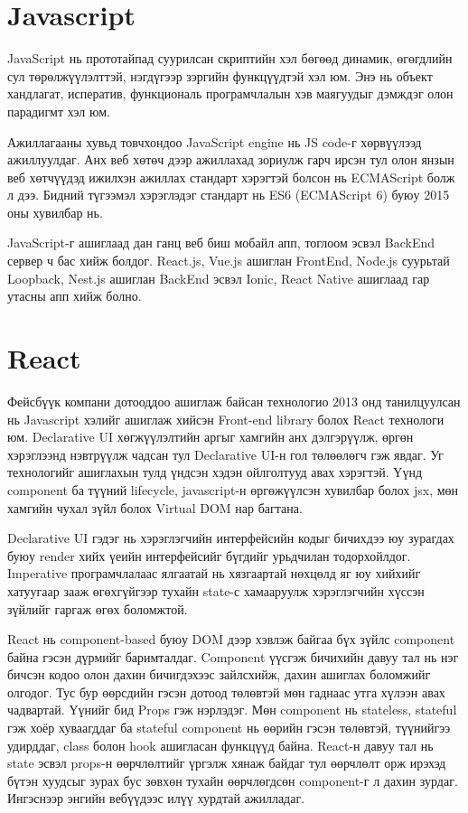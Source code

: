 \section{Javascript}
\quad JavaScript нь прототайпад суурилсан скриптийн хэл бөгөөд динамик, өгөгдлийн сул төрөлжүүлэлттэй, нэгдүгээр зэргийн функцүүдтэй хэл юм. Энэ нь объект хандлагат, исператив, функциональ програмчлалын хэв маягуудыг дэмждэг олон парадигмт хэл юм.

Ажиллагааны хувьд товчхондоо JavaScript engine нь JS code-г хөрвүүлээд ажиллуулдаг. Анх веб хөтөч дээр ажиллахад зориулж гарч ирсэн тул олон янзын веб хөтчүүдэд ижилхэн ажиллах стандарт хэрэгтэй болсон нь ECMAScript болж л дээ. Бидний түгээмэл хэрэглэдэг стандарт нь ES6 (ECMAScript 6) буюу 2015 оны хувилбар нь.

JavaScript-г ашиглаад дан ганц веб биш мобайл апп, тоглоом эсвэл BackEnd сервер ч бас хийж болдог. React.js, Vue.js ашиглан FrontEnd, Node.js суурьтай Loopback, Nest.js ашиглан BackEnd эсвэл Ionic, React Native ашиглаад гар утасны апп хийж болно.

\section{React}
Фейсбүүк компани дотооддоо ашиглаж байсан технологио 2013 онд танилцуулсан нь Javascript хэлийг ашиглаж хийсэн Front-end library болох React технологи юм. Declarative UI хөгжүүлэлтийн аргыг хамгийн анх дэлгэрүүлж, өргөн хэрэглээнд нэвтрүүлж чадсан тул Declarative UI-н гол төлөөлөгч гэж явдаг. Уг технологийг ашиглахын тулд үндсэн хэдэн ойлголтууд авах хэрэгтэй. Үүнд component ба түүний lifecycle, javascript-н өргөжүүлсэн хувилбар болох jsx, мөн хамгийн чухал зүйл болох Virtual DOM нар багтана.

Declarative UI гэдэг нь хэрэглэгчийн интерфейсийн кодыг бичихдээ юу зурагдах буюу render хийх үеийн интерфейсийг бүгдийг урьдчилан тодорхойлдог. Imperative програмчлалаас ялгаатай нь хязгаартай нөхцөлд яг юу хийхийг хатуугаар зааж өгөхгүйгээр тухайн state-с хамааруулж хэрэглэгчийн хүссэн зүйлийг гаргаж өгөх боломжтой.

React нь component-based буюу DOM дээр хэвлэж байгаа бүх зүйлс component байна гэсэн дүрмийг баримталдаг. Component үүсгэж бичихийн давуу тал нь нэг бичсэн кодоо олон дахин бичигдэхээс зайлсхийж, дахин ашиглах боломжийг олгодог. Тус бур өөрсдийн гэсэн дотоод төлөвтэй мөн гаднаас утга хүлээн авах чадвартай. Үүнийг бид Props гэж нэрлэдэг. Мөн component нь stateless, stateful гэж хоёр хуваагддаг ба stateful component нь өөрийн гэсэн төлөвтэй, түүнийгээ удирддаг, class болон hook ашигласан функцүүд байна. React-н давуу тал нь state эсвэл props-н өөрчлөлтийг үргэлж хянаж байдаг тул өөрчлөлт орж ирэхэд бүтэн хуудсыг зурах бус зөвхөн тухайн өөрчлөгдсөн component-г л дахин зурдаг. Ингэснээр энгийн вебүүдээс илүү хурдтай ажилладаг.

